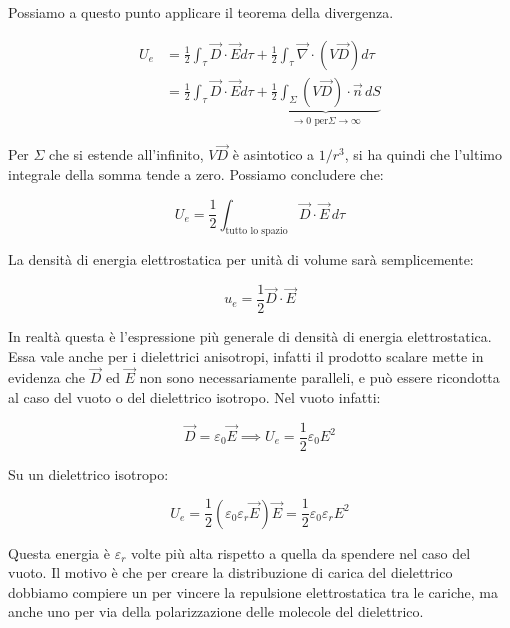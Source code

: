 Possiamo a questo punto applicare il teorema della divergenza.

\begin{align*}
	U_e &= \frac{1}{2} \int_{\tau}\vec{D} \cdot \vec{E} d\tau + \frac{1}{2} \int_{\tau} \vec{\nabla} \cdot (V\vec{D}) d\tau \\
	&= \frac{1}{2} \int_{\tau}\vec{D} \cdot \vec{E} d\tau + \underbrace{\frac{1}{2} \int_{\Sigma} (V\vec{D})\cdot \vec{n} \,dS}_{\to 0 \text{ per}\Sigma \to \infty}
\end{align*}

Per $\Sigma$ che si estende all'infinito, $ V\vec{D} $ è asintotico a $1/r^3$, si ha quindi che l'ultimo integrale della somma tende a zero. Possiamo concludere che:

\[
	\boxed{U_e = \frac{1}{2} \int_{\text{tutto lo spazio}}\vec{D} \cdot \vec{E} \,d\tau}
\]

La densità di energia elettrostatica per unità di volume sarà semplicemente:

\[
	\boxed{u_e=\frac{1}{2} \vec{D} \cdot \vec{E}}
\]

In realtà questa è l'espressione più generale di densità di energia elettrostatica. Essa vale anche per i dielettrici anisotropi, infatti il prodotto scalare mette in evidenza che $\vec{D}$ ed $\vec{E}$ non sono necessariamente paralleli, e può essere ricondotta al caso del vuoto o del dielettrico isotropo. Nel vuoto infatti:

\[
	\vec{D} =\varepsilon_0 \vec{E} \implies U_e=\frac{1}{2} \varepsilon_0 E^2
\]

Su un dielettrico isotropo:

\[
	U_e = \frac{1}{2} (\varepsilon_0 \varepsilon_r \vec{E} )\vec{E} = \frac{1}{2} \varepsilon_0 \varepsilon_r E^2
\]

Questa energia è $ \varepsilon_r  $ volte più alta rispetto a quella da spendere nel caso del vuoto. Il motivo è che per creare la distribuzione di carica del dielettrico dobbiamo compiere un per vincere la repulsione elettrostatica tra le cariche, ma anche uno per via della polarizzazione delle molecole del dielettrico.